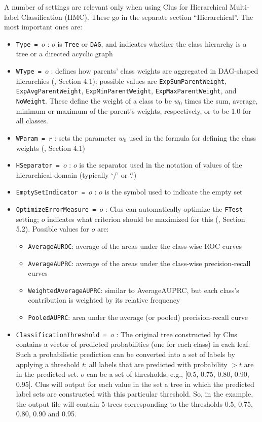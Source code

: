 \documentclass[a4paper]{report}
\begin{document}
A number of settings are relevant only when using Clus for Hierarchical Multi-label Classification (HMC).  These go in the separate section ``Hierarchical''.  The most important ones are:

\begin{itemize}
\item {\tt Type = $o$} : $o$ is {\tt Tree} or {\tt DAG}, and indicates whether the class hierarchy is a tree or a directed acyclic graph \cite{Vens08:jrnl}
\item {\tt WType = $o$} : defines how parents' class weights are aggregated in DAG-shaped hierarchies (\cite{Vens08:jrnl}, Section 4.1): possible values are {\tt ExpSumParentWeight}, {\tt ExpAvgParentWeight}, {\tt ExpMinParentWeight}, {\tt ExpMaxParentWeight}, and {\tt NoWeight}.  These define the weight of a class to be $w_0$ times the sum, average, minimum or maximum of the parent's weights, respectively, or to be 1.0 for all classes. 
\item {\tt WParam = $r$} : sets the parameter $w_0$ used in the formula for defining the class weights (\cite{Vens08:jrnl}, Section 4.1)
\item {\tt HSeparator = $o$} : $o$ is the separator used in the notation of values of the hierarchical domain (typically `/' or `.') 
\item {\tt EmptySetIndicator = $o$} : $o$ is the symbol used to indicate the empty set
\item {\tt OptimizeErrorMeasure = $o$} : Clus can automatically optimize the {\tt FTest} setting; $o$ indicates what criterion should be maximized for this (\cite{Vens08:jrnl}, Section 5.2).  Possible values for $o$ are:
  \begin{itemize}
   \item {\tt AverageAUROC}: average of the areas under the class-wise ROC curves
   \item {\tt AverageAUPRC}: average of the areas under the class-wise precision-recall curves
   \item {\tt WeightedAverageAUPRC}: similar to AverageAUPRC, but each class's contribution is                         weighted by its relative frequency
   \item {\tt PooledAUPRC}: area under the average (or pooled) precision-recall curve
  \end{itemize}
\item {\tt ClassificationThreshold = $o$} : The original tree constructed by Clus contains a vector of predicted probabilities (one for each class) in each leaf. Such a probabilistic prediction can be converted into a set of labels by applying a threshold $t$: all labels that are predicted with probability $> t$ are in the predicted set.  $o$ can be a set of thresholds, e.g., [0.5, 0.75, 0.80, 0.90, 0.95]. Clus will output for each value in the set a tree in which the predicted label sets are constructed with this particular threshold. So, in the example, the output file will contain 5 trees corresponding to the thresholds 0.5, 0.75, 0.80, 0.90 and 0.95.

\end{itemize}
\end{document}
